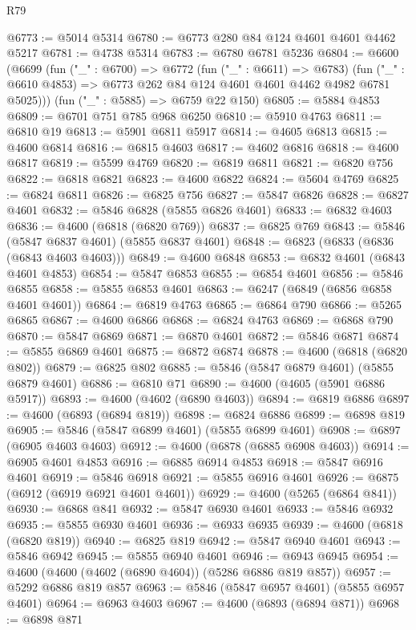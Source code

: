 \begin{lexlean}{R79}
\begin{coremodule}
@6773 := @5014 @5314
@6780 := @6773 @280 @84 @124 @4601 @4601 @4462 @5217
@6781 := @4738 @5314
@6783 := @6780 @6781 @5236
@6804 := @6600
    (@6699
      (fun ("_" : @6700) =>
      @6772
        (fun ("_" : @6611) => @6783)
        (fun ("_" : @6610 @4853) => @6773 @262 @84 @124 @4601 @4601 @4462 @4982 @6781 @5025)))
    (fun ("_" : @5885) => @6759 @22 @150)
@6805 := @5884 @4853
@6809 := @6701 @751 @785 @968 @6250
@6810 := @5910 @4763
@6811 := @6810 @19
@6813 := @5901 @6811 @5917
@6814 := @4605 @6813
@6815 := @4600 @6814
@6816 := @6815 @4603
@6817 := @4602 @6816
@6818 := @4600 @6817
@6819 := @5599 @4769
@6820 := @6819 @6811
@6821 := @6820 @756
@6822 := @6818 @6821
@6823 := @4600 @6822
@6824 := @5604 @4769
@6825 := @6824 @6811
@6826 := @6825 @756
@6827 := @5847 @6826
@6828 := @6827 @4601
@6832 := @5846 @6828 (@5855 @6826 @4601)
@6833 := @6832 @4603
@6836 := @4600 (@6818 (@6820 @769))
@6837 := @6825 @769
@6843 := @5846 (@5847 @6837 @4601) (@5855 @6837 @4601)
@6848 := @6823 (@6833 (@6836 (@6843 @4603 @4603)))
@6849 := @4600 @6848
@6853 := @6832 @4601 (@6843 @4601 @4853)
@6854 := @5847 @6853
@6855 := @6854 @4601
@6856 := @5846 @6855
@6858 := @5855 @6853 @4601
@6863 := @6247 (@6849 (@6856 @6858 @4601 @4601))
@6864 := @6819 @4763
@6865 := @6864 @790
@6866 := @5265 @6865
@6867 := @4600 @6866
@6868 := @6824 @4763
@6869 := @6868 @790
@6870 := @5847 @6869
@6871 := @6870 @4601
@6872 := @5846 @6871
@6874 := @5855 @6869 @4601
@6875 := @6872 @6874
@6878 := @4600 (@6818 (@6820 @802))
@6879 := @6825 @802
@6885 := @5846 (@5847 @6879 @4601) (@5855 @6879 @4601)
@6886 := @6810 @71
@6890 := @4600 (@4605 (@5901 @6886 @5917))
@6893 := @4600 (@4602 (@6890 @4603))
@6894 := @6819 @6886
@6897 := @4600 (@6893 (@6894 @819))
@6898 := @6824 @6886
@6899 := @6898 @819
@6905 := @5846 (@5847 @6899 @4601) (@5855 @6899 @4601)
@6908 := @6897 (@6905 @4603 @4603)
@6912 := @4600 (@6878 (@6885 @6908 @4603))
@6914 := @6905 @4601 @4853
@6916 := @6885 @6914 @4853
@6918 := @5847 @6916 @4601
@6919 := @5846 @6918
@6921 := @5855 @6916 @4601
@6926 := @6875 (@6912 (@6919 @6921 @4601 @4601))
@6929 := @4600 (@5265 (@6864 @841))
@6930 := @6868 @841
@6932 := @5847 @6930 @4601
@6933 := @5846 @6932
@6935 := @5855 @6930 @4601
@6936 := @6933 @6935
@6939 := @4600 (@6818 (@6820 @819))
@6940 := @6825 @819
@6942 := @5847 @6940 @4601
@6943 := @5846 @6942
@6945 := @5855 @6940 @4601
@6946 := @6943 @6945
@6954 := @4600 (@4600 (@4602 (@6890 @4604)) (@5286 @6886 @819 @857))
@6957 := @5292 @6886 @819 @857
@6963 := @5846 (@5847 @6957 @4601) (@5855 @6957 @4601)
@6964 := @6963 @4603
@6967 := @4600 (@6893 (@6894 @871))
@6968 := @6898 @871

\end{coremodule}
\end{lexlean}
